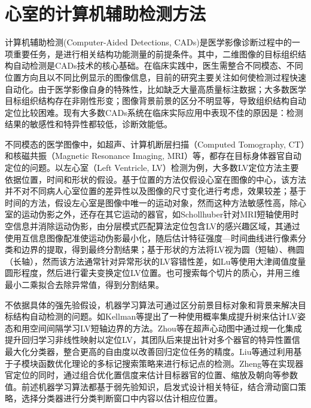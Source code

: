 \chapter{心室的计算机辅助检测方法}
\label{chap:Detection}


计算机辅助检测(Computer-Aided Detections, CADs)是医学影像诊断过程中的一项重要任务，是进行相关结构功能测量的前提条件。其中，二维图像的目标组织结构自动检测是CADs技术的核心基础。在临床实践中，医生需整合不同模态、不同位置方向且以不同比例显示的图像信息，目前的研究主要关注如何使检测过程快速自动化。由于医学影像自身的特殊性，比如缺乏大量高质量标注数据；大多数医学目标组织结构存在非刚性形变；图像背景前景的区分不明显等，导致组织结构自动定位比较困难。现有大多数CADs系统在临床实际应用中表现不佳的原因是：检测结果的敏感性和特异性都较低，诊断效能低\cite{Cheng2016a}。


不同模态的医学图像中，如超声、计算机断层扫描（Computed Tomography, CT）和核磁共振（Magnetic Resonance Imaging, MRI）等，都存在目标身体器官自动定位的问题。以左心室（Left Ventricle, LV）检测为例，大多数LV定位方法主要依据位置，时间和形状的假设。基于位置的方法仅假设心室在图像的中心，该方法并不对不同病人心室位置的差异性以及图像的尺寸变化进行考虑，效果较差；基于时间的方法，假设左心室是图像中唯一的运动对象，然而这种方法敏感性高，除心室的运动伪影之外，还存在其它运动的器官，如Schollhuber\citep{Schollhuber2008}针对MRI短轴使用时空信息并消除运动伪影，由分层模式匹配算法定位包含LV的感兴趣区域，其通过使用互信息图像配准使运动伪影最小化，随后估计特征强度—时间曲线进行像素分类和边界的提取，得到最终分割结果；基于形状的方法将LV视为圆（短轴）、椭圆（长轴），然而该方法通常针对异常形状的LV容错性差，如Lu等\citep{Lu2009}使用大津阈值度量圆形程度，然后进行霍夫变换定位LV位置。也可搜索每个切片的质心，并用三维最小二乘拟合去除异常值，得到分割结果\citep{Petitjean2011}。


不依据具体的强先验假设，机器学习算法可通过区分前景目标对象和背景来解决目标结构自动检测的问题。如Kellman等\citep{Lu2011}提出了一种使用概率集成提升树来估计LV姿态和用空间间隔学习LV短轴边界的方法。Zhou等\citep{Zhou2005}在超声心动图中通过规一化集成提升回归学习非线性映射以定位LV，其团队后来提出针对多个器官的特异性置信最大化分类器，整合更高的自由度以改善回归定位任务的精度。Liu等\citep{She2007}通过利用基于子模块函数优化理论的多标记搜索策略来进行标记点的检测。Zheng等\citep{Zheng2014}在实现器官定位的同时，通过组合优化置信度来估计目标器官的位置、缩放及朝向等参数值。前述机器学习算法都基于弱先验知识，启发式设计相关特征，结合滑动窗口策略，选择分类器进行分类判断窗口中内容以估计相应位置。


